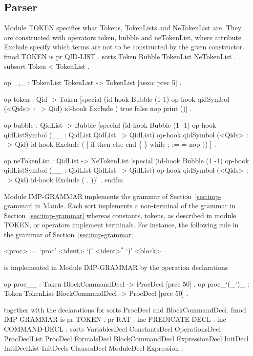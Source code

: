 \documentclass[a4paper,openany]{book}
\begin{document}
\subsection{Parser}

Module {\Tt{}TOKEN\nwendquote} specifies what {\Tt{}Tokens\nwendquote}, {\Tt{}TokenLists\nwendquote} and {\Tt{}NeTokenList\nwendquote} are. They are constructed with operators {\Tt{}token\nwendquote}, {\Tt{}bubble\nwendquote} and {\Tt{}neTokenList\nwendquote}, where attribute {\Tt{}Exclude\nwendquote} specify which terms are not to be constructed by the given constructor.
\endmoddef\nwstartdeflinemarkup\nwenddeflinemarkup
 fmod TOKEN is
 pr QID-LIST .
 sorts Token Bubble TokenList NeTokenList .
 subsort Token < TokenList .

 op _,_ : TokenList TokenList -> TokenList [assoc prec 5] .

 op token : Qid -> Token
    [special
      (id-hook Bubble        (1 1)
       op-hook qidSymbol     (<Qids> : ~> Qid)
       id-hook Exclude       ( true false nop print ))] .

 op bubble : QidList -> Bubble
    [special
      (id-hook Bubble        (1 -1)
       op-hook qidListSymbol (__ : QidList QidList ~> QidList)
       op-hook qidSymbol     (<Qids> : ~> Qid)
       id-hook Exclude       ( | if then else end \{ \} 
                               while ; := = nop )) ] .

 op neTokenList : QidList -> NeTokenList
    [special
      (id-hook Bubble        (1 -1)
       op-hook qidListSymbol (__ : QidList QidList ~> QidList)
       op-hook qidSymbol     (<Qids> : ~> Qid)
       id-hook Exclude       ( . ))] .
endfm
\nwendcode{}\nwdocspar

Module {\Tt{}IMP-GRAMMAR\nwendquote} implements the grammar of Section~\ref{sec:imp-grammar} in Maude. Each sort implements a non-terminal of the grammar in Section~\ref{sec:imp-grammar} whereas constants, tokens, as described in module {\Tt{}TOKEN\nwendquote}, or operators implement terminals. For instance, the following rule in the grammar of Section~\ref{sec:imp-grammar}
\begin{grammar}
<proc> := `proc' <ident> `(' <ident>$^*$ `)' <block>
\end{grammar}
is implemented in Module {\Tt{}IMP-GRAMMAR\nwendquote} by the operation declarations
\begin{maude}
 op proc__ : Token BlockCommandDecl -> ProcDecl [prec 50] .
 op proc_`(_`)_ : Token TokenList BlockCommandDecl -> ProcDecl [prec 50] .
\end{maude}
together with the declarations for sorts {\Tt{}ProcDecl\nwendquote} and {\Tt{}BlockCommandDecl\nwendquote}.
\nwenddocs{}\endmoddef\nwstartdeflinemarkup\nwenddeflinemarkup
fmod IMP-GRAMMAR is
 pr TOKEN .
 pr RAT .
 inc PREDICATE-DECL .
 inc COMMAND-DECL .
 sorts VariablesDecl ConstantsDecl OperationsDecl ProcDeclList
       ProcDecl FormalsDecl BlockCommandDecl ExpressionDecl
       InitDecl InitDeclList InitDecls ClausesDecl
       ModuleDecl Expression .
\end{document}
